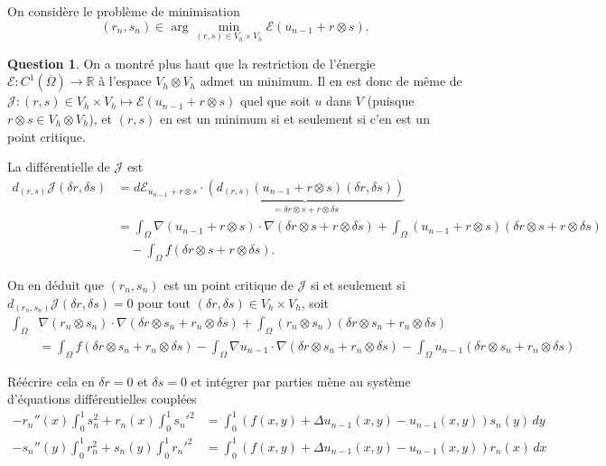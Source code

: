 \documentclass[11pt]{article}
\newcommand{\RR}{\mathbb{R}}
\theoremstyle{definition}
\newtheorem{ques}{Question}
\begin{document}
On considère le problème de minimisation
\begin{equation}
(r_n,s_n) \in \arg\min_{(r,s)\in V_h\times V_h} \mathcal{E}(u_{n-1}+r\otimes s).
\end{equation}


\begin{ques}
On a montré plus haut que la restriction de l'énergie $\mathcal{E}:C^1(\overline{\Omega})\longrightarrow \RR$ à l'espace $V_h\otimes V_h$ admet un minimum. Il en est donc de même de $\mathcal J:(r,s)\in V_h\times V_h\longmapsto \mathcal{E}(u_{n-1} + r\otimes s)$ quel que soit $u$ dans $V$ (puisque $r\otimes s\in V_h\otimes V_h$), et $(r,s)$ en est un minimum si et seulement si c'en est un point critique.

La différentielle de $\mathcal{J}$ est
\begin{align*}
d_{(r,s)}\mathcal J(\delta r,\delta s) 
&= d\mathcal{E}_{u_{n-1}+r\otimes s}\cdot
\underbrace{\left(
d_{(r,s)}(u_{n-1}+r\otimes s)(\delta r,\delta s)\right)
}_{= \delta r\otimes s + r\otimes\delta s} \\
&= \int_\Omega \nabla(u_{n-1}+r\otimes s)\cdot\nabla(\delta r\otimes s + r\otimes\delta s)
+ \int_\Omega (u_{n-1}+r\otimes s)(\delta r\otimes s + r\otimes\delta s)
\\ &\quad - \int_\Omega f(\delta r\otimes s + r\otimes\delta s).
\end{align*}

On en déduit que $(r_n,s_n)$ est un point critique de $\mathcal{J}$ si et seulement si $d_{(r_n,s_n)}\mathcal{J}(\delta r,\delta s) = 0$ pour tout $(\delta r,\delta s)\in V_h\times V_h$, soit
\begin{align}\label{eq:6}
\int_\Omega &\nabla(r_n\otimes s_n)\cdot\nabla(\delta r\otimes s_n + r_n\otimes \delta s) + \int_\Omega (r_n\otimes s_n)(\delta r\otimes s_n + r_n\otimes \delta s) \nonumber \\
&=\int_\Omega f(\delta r\otimes s_n + r_n\otimes\delta s) - \int_\Omega \nabla u_{n-1}\cdot\nabla(\delta r\otimes s_n + r_n\otimes\delta s) - \int_\Omega u_{n-1}(\delta r\otimes s_n + r_n\otimes\delta s)
\end{align}

Réécrire cela en $\delta r=0$ et $\delta s=0$ et intégrer par parties mène au système d'équations différentielles couplées
\begin{align*}
-r_n''(x)\int_0^1 s_n^2 + r_n(x)\int_{0}^{1}{s_n'}^2 &= \int_{0}^{1}(f(x,y)+\Delta u_{n-1}(x,y) - u_{n-1}(x,y))s_n(y)\,dy \\
-s_n''(y)\int_0^1 r_n^2 + s_n(y)\int_{0}^{1}{r_n'}^2 &= \int_{0}^{1}(f(x,y)+\Delta u_{n-1}(x,y) - u_{n-1}(x,y))r_n(x)\,dx
\end{align*}


\end{ques}
\end{document}
